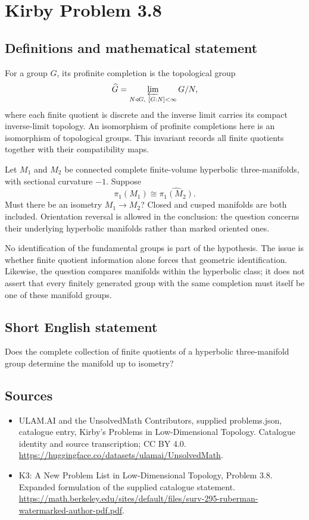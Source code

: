 \documentclass[11pt,a4paper]{article}
\begin{document}
\section*{Kirby Problem 3.8}\label{statement}

\subsection{Definitions and mathematical statement}
For a group $G$, its profinite completion is the topological group
\[
 \widehat G=\varprojlim_{N\triangleleft G,\ [G:N]<\infty}G/N,
\]
where each finite quotient is discrete and the inverse limit carries its
compact inverse-limit topology. An isomorphism of profinite completions here
is an isomorphism of topological groups. This invariant records all finite
quotients together with their compatibility maps.

Let $M_1$ and $M_2$ be connected complete finite-volume hyperbolic
three-manifolds, with sectional curvature $-1$. Suppose
\[
 \widehat{\pi_1(M_1)}\cong\widehat{\pi_1(M_2)}.
\]
Must there be an isometry $M_1\to M_2$? Closed and cusped manifolds are both
included. Orientation reversal is allowed in the conclusion: the question
concerns their underlying hyperbolic manifolds rather than marked oriented ones.

No identification of the fundamental groups is part of the hypothesis.
The issue is whether finite quotient information alone forces that geometric
identification. Likewise, the question compares manifolds within the hyperbolic
class; it does not assert that every finitely generated group with the same
completion must itself be one of these manifold groups.
\subsection{Short English statement}
Does the complete collection of finite quotients of a hyperbolic three-manifold group determine the manifold up to isometry?
\subsection{Sources}
\begin{itemize}
\item[S1] ULAM.AI and the UnsolvedMath Contributors, supplied problems.json, catalogue entry, Kirby's Problems in Low-Dimensional Topology. Catalogue identity and source transcription; CC BY 4.0.
\url{https://huggingface.co/datasets/ulamai/UnsolvedMath}.
\item[S2] K3: A New Problem List in Low-Dimensional Topology, Problem 3.8. Expanded formulation of the supplied catalogue statement.
\url{https://math.berkeley.edu/sites/default/files/surv-295-ruberman-watermarked-author-pdf.pdf}.
\end{itemize}
\end{document}
